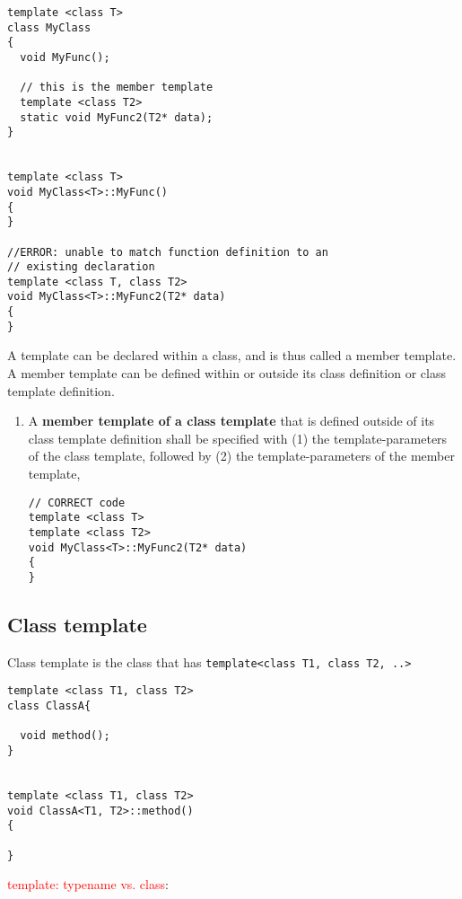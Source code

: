 \begin{verbatim}
template <class T>
class MyClass
{
  void MyFunc();
  
  // this is the member template
  template <class T2>
  static void MyFunc2(T2* data);
}


template <class T>
void MyClass<T>::MyFunc()
{
}

//ERROR: unable to match function definition to an 
// existing declaration
template <class T, class T2>
void MyClass<T>::MyFunc2(T2* data)
{
}
\end{verbatim}  

A template can be declared within a class, and is thus called a member template.
A member template can be defined within or outside its class definition or class
template definition.

\begin{enumerate}
  \item A {\bf member template of a class template} that is defined outside of its class template definition
  shall be specified with (1) the template-parameters of the class template, followed by (2) 
  the template-parameters of the member template,
  
\begin{verbatim}
// CORRECT code
template <class T>
template <class T2>
void MyClass<T>::MyFunc2(T2* data)
{
}
\end{verbatim}  

\end{enumerate}

\subsection{Class template}
\label{sec:template-class}
\label{sec:class-template}

Class template is the class that has \verb!template<class T1, class T2, ..>! 

\begin{verbatim}
template <class T1, class T2>
class ClassA{

  void method();
}


template <class T1, class T2>
void ClassA<T1, T2>::method()
{

}

\end{verbatim}


\textcolor{red}{template: typename vs. class}:
\label{sec:typename-vs.-class}
\label{sec:class-vs.-typename}


